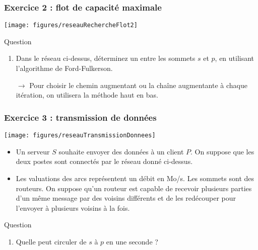 \documentclass[french,10pt,t,handout]{beamer}
\begin{document}
\begin{frame}
	\frametitle{Exercice 2 : flot de capacit\'e maximale}
	\vspace{-0.5cm}
	
	\begin{center}
   		\texttt{[image: figures/reseauRechercheFlot2]} 
	\end{center}
	\vspace{-0.5cm}
	
	\begin{exampleblock}{Question}
		\begin{enumerate}
			\item Dans le r\'eseau ci-dessus, d\'eterminez un  entre les sommets $s$ et $p$, en utilisant
				  l'algorithme de Ford-Fulkerson.
			\item[$\rightarrow$] Pour choisir le chemin augmentant ou la cha\^ine
								 augmentante \`a chaque it\'eration, on utilisera la m\'ethode \og{}haut
								 en bas\fg{}.
		\end{enumerate}
	\end{exampleblock}

\end{frame}


\begin{frame}
	\frametitle{Exercice 3 : transmission de donn\'ees}
	\vspace{-1cm}
	
	\begin{center}
   		\texttt{[image: figures/reseauTransmissionDonnees]} 
	\end{center}
	\vspace{-0.5cm}
	
	\begin{itemize}
	  	\item Un serveur $S$ souhaite envoyer des donn\'ees \`a un client $P$. On
	  		  suppose que les deux postes sont connect\'es par le r\'eseau
	  		  donn\'e ci-dessus.
		\item Les valuations des arcs repr\'esentent un d\'ebit en Mo/s. Les sommets
			  sont des routeurs.
			  On suppose qu'un routeur est capable de recevoir plusieurs parties d'un
			  m\^eme message par des voisins diff\'erents et de les red\'ecouper pour
			  l'envoyer \`a plusieurs voisins \`a la fois.
	\end{itemize}
	
	\begin{exampleblock}{Question}
		\begin{enumerate}
			\item Quelle  peut circuler de $s$ \`a
				  $p$ en une seconde ?
		\end{enumerate}
	\end{exampleblock}

\end{frame}
\end{document}
